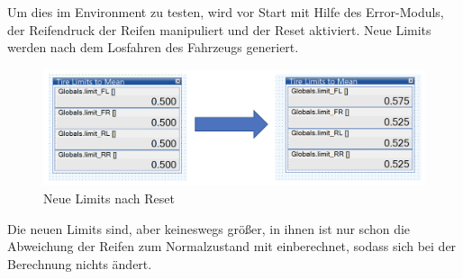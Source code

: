 Um dies im Environment zu testen, wird vor Start mit Hilfe des Error-Moduls, der Reifendruck der Reifen manipuliert und der Reset aktiviert.
Neue Limits werden nach dem Losfahren des Fahrzeugs generiert.
\begin{figure}[H]
	\centering
	\includegraphics[width=1\linewidth]{../Graphiken/ResetDone.png}
	\caption{Neue Limits nach Reset}
	\label{fig:ResetState}
\end{figure}
Die neuen Limits sind, aber keineswegs größer, in ihnen ist nur schon die Abweichung der Reifen zum Normalzustand mit einberechnet, sodass sich bei der Berechnung nichts ändert.